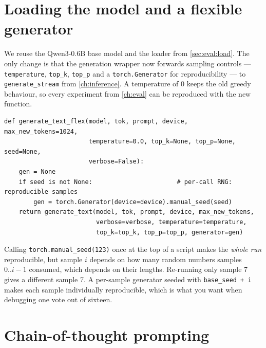 \section{Loading the model and a flexible generator}\label{sec:scaling:load}

We reuse the Qwen3-0.6B base model and the loader from \cref{sec:eval:load}. The only change is
that the generation wrapper now forwards sampling controls --- \texttt{temperature},
\texttt{top\_k}, \texttt{top\_p} and a \texttt{torch.Generator} for reproducibility --- to
\texttt{generate\_stream} from \cref{ch:inference}. A temperature of 0 keeps the old greedy
behaviour, so every experiment from \cref{ch:eval} can be reproduced with the new function.

\begin{lstlisting}[caption={The generation wrapper with sampling knobs (extends \cref{lst:eval:wrapper}).},label={lst:scaling:flex}]
def generate_text_flex(model, tok, prompt, device, max_new_tokens=1024,
                       temperature=0.0, top_k=None, top_p=None, seed=None,
                       verbose=False):
    gen = None
    if seed is not None:                       # per-call RNG: reproducible samples
        gen = torch.Generator(device=device).manual_seed(seed)
    return generate_text(model, tok, prompt, device, max_new_tokens,
                         verbose=verbose, temperature=temperature,
                         top_k=top_k, top_p=top_p, generator=gen)
\end{lstlisting}

\begin{pitfall}
Calling \texttt{torch.manual\_seed(123)} once at the top of a script makes the \emph{whole run}
reproducible, but sample $i$ depends on how many random numbers samples $0..i-1$ consumed, which
depends on their lengths. Re-running only sample 7 gives a different sample 7. A per-sample
generator seeded with \texttt{base\_seed + i} makes each sample individually reproducible, which
is what you want when debugging one vote out of sixteen.
\end{pitfall}

\section{Chain-of-thought prompting}\label{sec:scaling:cot}

